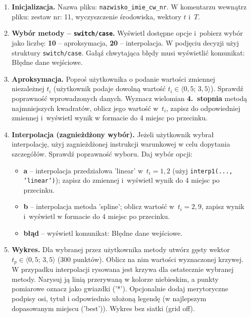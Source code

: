 \documentclass[a4paper,11pt]{article}
\begin{document}
\begin{enumerate}[leftmargin=*, label=\textbf{\arabic*.}, itemsep=2pt]

  \item \textbf{Inicjalizacja.}
    Nazwa pliku: \texttt{nazwisko\_imie\_cw\_nr}. W komentarzu wewnątrz pliku: zestaw nr: 11, wyczyszczenie środowiska, wektory $t$ i~$T$.

  \item \textbf{Wybór metody -- \texttt{switch/case}.}
    Wyświetl dostępne opcje i~pobierz wybór jako liczbę: \textbf{10} -- aproksymacja, \textbf{20} -- interpolacja. W podjęciu decyzji użyj struktury \texttt{switch/case}. Gałąź chwytająca błędy musi wyświetlić komunikat: Błędne dane wejściowe.

  \item \textbf{Aproksymacja.}
    Poproś użytkownika o podanie wartości zmiennej niezależnej $t_i$ (użytkownik podaje dowolną wartość $t_i \in \langle 0{,}5;\,3{,}5 \rangle$). Sprawdź poprawność wprowadzonych danych. Wyznacz wielomian \textbf{4.~stopnia} metodą najmniejszych kwadratów, oblicz jego wartość w~$t_i$, zapisz do odpowiedniej zmiennej i~wyświetl wynik w formacie do 4 miejsc po przecinku.

  \item \textbf{Interpolacja (zagnieżdżony wybór).}
    Jeżeli użytkownik wybrał interpolację, użyj zagnieżdżonej instrukcji warunkowej w celu dopytania szczegółów. Sprawdź poprawność wyboru. Daj wybór opcji:
    \begin{itemize}[itemsep=1pt]
      \item \textbf{a} -- interpolacja przedziałowa 'linear' w~$t_i = 1{,}2$ (użyj \texttt{interp1(..., 'linear')}); zapisz do zmiennej i~wyświetl wynik do 4 miejsc po przecinku.
      \item \textbf{b} -- interpolacja metoda 'spline'; oblicz wartość w~$t_i = 2{,}9$, zapisz wynik i~wyświetl w formacie do 4 miejsc po przecinku.
      \item \textbf{błąd} -- wyświetl komunikat: Błędne dane wejściowe.
    \end{itemize}

  \item \textbf{Wykres.}
    Dla wybranej przez użytkownika metody utwórz gęsty wektor $t_p \in \langle 0{,}5;\,3{,}5 \rangle$ (300 punktów). Oblicz na nim wartości wyznaczonej krzywej. W przypadku interpolacji rysowana jest krzywa dla ostatecznie wybranej metody. Narysuj ją linią przerywaną w kolorze niebieskim, a punkty pomiarowe oznacz jako gwiazdki ('*'). Opcjonalnie dodaj merytoryczne podpisy osi, tytuł i odpowiednio ułożoną legendę (w najlepszym dopasowanym miejscu ('best')). Wykres bez siatki (grid off).

\end{enumerate}
\end{document}
